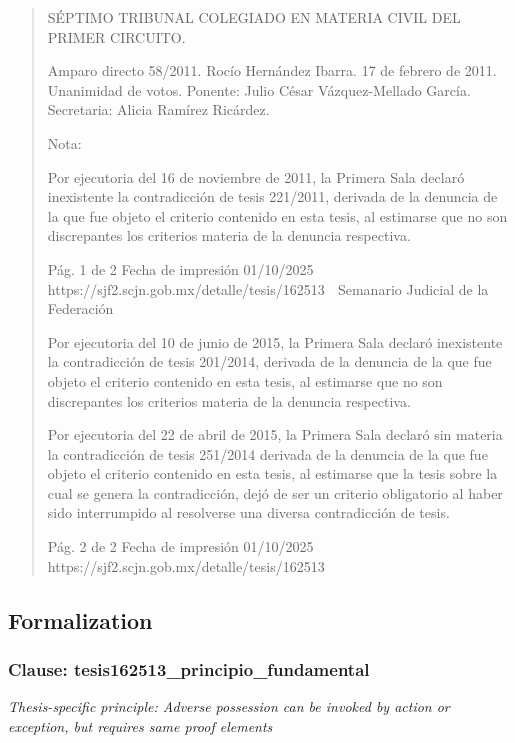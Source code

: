 \documentclass[11pt,a4paper]{article}
\begin{document}
\begin{quote}
SÉPTIMO TRIBUNAL COLEGIADO EN MATERIA CIVIL DEL PRIMER CIRCUITO.


Amparo directo 58/2011. Rocío Hernández Ibarra. 17 de febrero de 2011. Unanimidad de votos.
Ponente: Julio César Vázquez-Mellado García. Secretaria: Alicia Ramírez Ricárdez.

Nota:

Por ejecutoria del 16 de noviembre de 2011, la Primera Sala declaró inexistente la contradicción de
tesis 221/2011, derivada de la denuncia de la que fue objeto el criterio contenido en esta tesis, al
estimarse que no son discrepantes los criterios materia de la denuncia respectiva.


                                              Pág. 1 de 2             Fecha de impresión 01/10/2025
  https://sjf2.scjn.gob.mx/detalle/tesis/162513
                                                  Semanario Judicial de la Federación

Por ejecutoria del 10 de junio de 2015, la Primera Sala declaró inexistente la contradicción de tesis
201/2014, derivada de la denuncia de la que fue objeto el criterio contenido en esta tesis, al
estimarse que no son discrepantes los criterios materia de la denuncia respectiva.

Por ejecutoria del 22 de abril de 2015, la Primera Sala declaró sin materia la contradicción de tesis
251/2014 derivada de la denuncia de la que fue objeto el criterio contenido en esta tesis, al
estimarse que la tesis sobre la cual se genera la contradicción, dejó de ser un criterio obligatorio al
haber sido interrumpido al resolverse una diversa contradicción de tesis.




                                              Pág. 2 de 2             Fecha de impresión 01/10/2025
  https://sjf2.scjn.gob.mx/detalle/tesis/162513

\end{quote}

\subsection{Formalization}

\subsubsection{Clause: tesis162513\_principio\_fundamental}

\textit{Thesis-specific principle: Adverse possession can be invoked by action or exception, but requires same proof elements}
\end{document}
